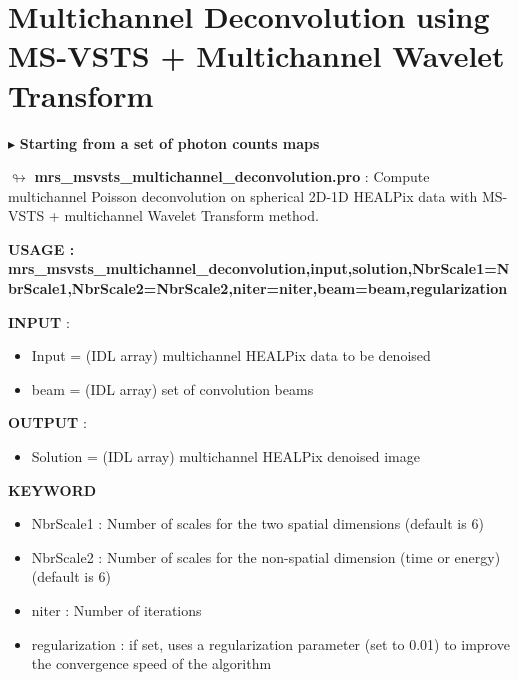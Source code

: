 


\section{Multichannel Deconvolution using MS-VSTS + Multichannel Wavelet Transform}

\vspace{0.3cm}

$\blacktriangleright$   \textbf {Starting from a set of photon counts maps}

\vspace{0.3cm}

$\looparrowright$ \textbf{mrs\_msvsts\_multichannel\_deconvolution.pro} :  Compute multichannel Poisson deconvolution on spherical 2D-1D HEALPix data with MS-VSTS + multichannel Wavelet Transform method.

\begin{center}
 \bf{USAGE : mrs\_msvsts\_multichannel\_deconvolution,input,solution,NbrScale1=NbrScale1,NbrScale2=NbrScale2,niter=niter,beam=beam,regularization}
\end{center}

\textbf{INPUT} : 
\begin{itemize}
\item{Input = (IDL array) multichannel HEALPix data to be denoised}
\item{beam = (IDL array) set of convolution beams}
\end{itemize}

\textbf{OUTPUT} : 
\begin{itemize}
\item{Solution = (IDL array) multichannel HEALPix denoised image}
\end{itemize}

\textbf{KEYWORD}

\begin{itemize}
  \item NbrScale1 : Number of scales for the two spatial dimensions (default is 6)
  \item NbrScale2 : Number of scales for the non-spatial dimension (time or energy) (default is 6)
  \item niter  : Number of iterations
  \item regularization : if set, uses a regularization parameter (set to 0.01) to improve the convergence speed of the algorithm
\end{itemize}






